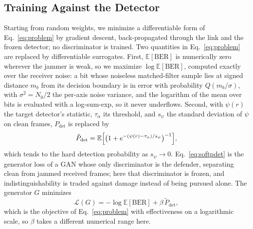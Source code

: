 \subsection{Training Against the Detector}
\label{sec:method:objective}
Starting from random weights, we minimize a differentiable form of Eq.~\eqref{eq:problem} by gradient descent, back-propagated through the link and the frozen detector; no discriminator is trained.
Two quantities in Eq.~\eqref{eq:problem} are replaced by differentiable surrogates.
First, $\mathbb{E}[\mathrm{BER}]$ is numerically zero wherever the jammer is weak, so we maximize $\log\mathbb{E}[\mathrm{BER}]$, computed exactly over the receiver noise: a bit whose noiseless matched-filter sample lies at signed distance $m_b$ from its decision boundary is in error with probability $Q(m_b/\sigma)$, with $\sigma^2=N_0/2$ the per-axis noise variance, and the logarithm of the mean over bits is evaluated with a log-sum-exp, so it never underflows.
Second, with $\psi(r)$ the target detector's statistic, $\tau_\alpha$ its threshold, and $s_\psi$ the standard deviation of $\psi$ on clean frames, $P_{\mathrm{det}}$ is replaced by
\begin{equation}
\tilde P_{\mathrm{det}}=\mathbb{E}\Bigl[\bigl(1+e^{-(\psi(r)-\tau_\alpha)/s_\psi}\bigr)^{-1}\Bigr],
\label{eq:softpdet}
\end{equation}
which tends to the hard detection probability as $s_\psi\to0$.
Eq.~\eqref{eq:softpdet} is the generator loss of a GAN whose only discriminator is the defender, separating clean from jammed received frames; here that discriminator is frozen, and indistinguishability is traded against damage instead of being pursued alone.
The generator $G$ minimizes
\begin{equation}
\mathcal{L}(G)=-\log\mathbb{E}[\mathrm{BER}]+\beta\,\tilde P_{\mathrm{det}},
\label{eq:loss}
\end{equation}
which is the objective of Eq.~\eqref{eq:problem} with effectiveness on a logarithmic scale, so $\beta$ takes a different numerical range here.

